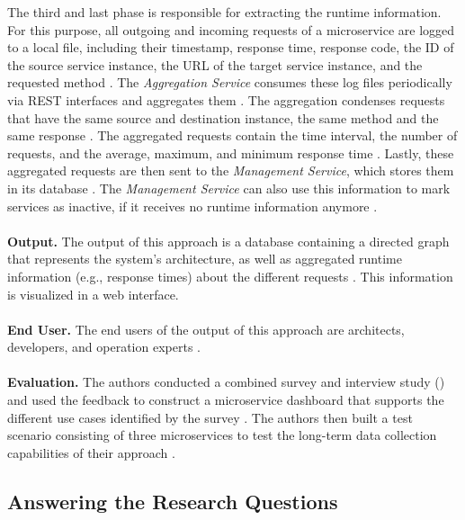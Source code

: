 The third and last phase is responsible for extracting the runtime information.
For this purpose, all outgoing and incoming requests of a microservice are logged to a local file, including their timestamp, response time, response code, the ID of the source service instance, the URL of the target service instance, and the requested method \cite{Mayer2018}.
The \textit{Aggregation Service} consumes these log files periodically via REST interfaces and aggregates them \cite{Mayer2018}.
The aggregation condenses requests that have the same source and destination instance, the same method and the same response \cite{Mayer2018}.
The aggregated requests contain the time interval, the number of requests, and the average, maximum, and minimum response time \cite{Mayer2018}.
Lastly, these aggregated requests are then sent to the \textit{Management Service}, which stores them in its database \cite{Mayer2018}.
The \textit{Management Service} can also use this information to mark services as inactive, if it receives no runtime information anymore \cite{Mayer2018}.
\\ \\
\textbf{Output.}
The output of this approach is a database containing a directed graph that represents the system's architecture, as well as aggregated runtime information (e.g., response times) about the different requests \cite{Mayer2018}.
This information is visualized in a web interface.
\\ \\
\textbf{End User.}
The end users of the output of this approach are architects, developers, and operation experts \cite{Mayer2018}.
\\ \\
\textbf{Evaluation.}
The authors conducted a combined survey and interview study (\cite{Mayer2017dashboard}) and used the feedback to construct a microservice dashboard that supports the different use cases identified by the survey \cite{Mayer2018}.
The authors then built a test scenario consisting of three microservices to test the long-term data collection capabilities of their approach \cite{Mayer2018}.


\subsection{Answering the Research Questions}
\label{sec:Results:AnsweringRQ}

